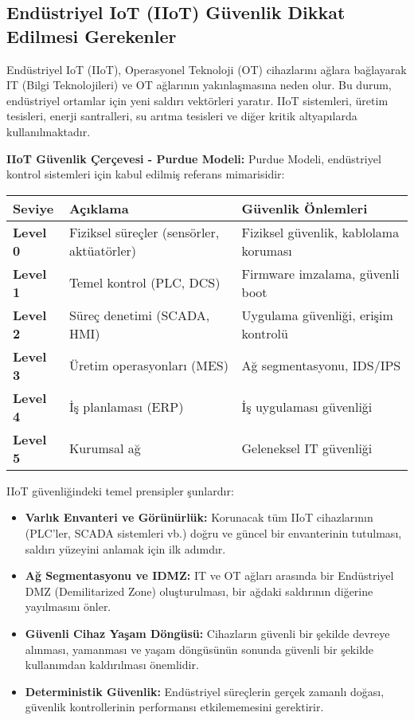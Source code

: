 \subsection{Endüstriyel IoT (IIoT) Güvenlik Dikkat Edilmesi Gerekenler}

Endüstriyel IoT (IIoT), Operasyonel Teknoloji (OT) cihazlarını ağlara bağlayarak IT (Bilgi Teknolojileri) ve OT ağlarının yakınlaşmasına neden olur. Bu durum, endüstriyel ortamlar için yeni saldırı vektörleri yaratır. IIoT sistemleri, üretim tesisleri, enerji santralleri, su arıtma tesisleri ve diğer kritik altyapılarda kullanılmaktadır.

\textbf{IIoT Güvenlik Çerçevesi - Purdue Modeli:}
Purdue Modeli, endüstriyel kontrol sistemleri için kabul edilmiş referans mimarisidir:

\begin{tabular}{|p{4cm}|p{6cm}|p{4cm}|}
\hline
\hline
\textbf{Seviye} & \textbf{Açıklama} & \textbf{Güvenlik Önlemleri} \\
\hline
\hline
\textbf{Level 0} & Fiziksel süreçler (sensörler, aktüatörler) & Fiziksel güvenlik, kablolama koruması \\
\hline
\hline
\textbf{Level 1} & Temel kontrol (PLC, DCS) & Firmware imzalama, güvenli boot \\
\hline
\hline
\textbf{Level 2} & Süreç denetimi (SCADA, HMI) & Uygulama güvenliği, erişim kontrolü \\
\hline
\hline
\textbf{Level 3} & Üretim operasyonları (MES) & Ağ segmentasyonu, IDS/IPS \\
\hline
\hline
\textbf{Level 4} & İş planlaması (ERP) & İş uygulaması güvenliği \\
\hline
\hline
\textbf{Level 5} & Kurumsal ağ & Geleneksel IT güvenliği \\
\hline
\hline
\hline
\end{tabular}

IIoT güvenliğindeki temel prensipler şunlardır:
\begin{itemize}
    \item \textbf{Varlık Envanteri ve Görünürlük:} Korunacak tüm IIoT cihazlarının (PLC'ler, SCADA sistemleri vb.) doğru ve güncel bir envanterinin tutulması, saldırı yüzeyini anlamak için ilk adımdır.
    \item \textbf{Ağ Segmentasyonu ve IDMZ:} IT ve OT ağları arasında bir Endüstriyel DMZ (Demilitarized Zone) oluşturulması, bir ağdaki saldırının diğerine yayılmasını önler.
    \item \textbf{Güvenli Cihaz Yaşam Döngüsü:} Cihazların güvenli bir şekilde devreye alınması, yamanması ve yaşam döngüsünün sonunda güvenli bir şekilde kullanımdan kaldırılması önemlidir.
    \item \textbf{Deterministik Güvenlik:} Endüstriyel süreçlerin gerçek zamanlı doğası, güvenlik kontrollerinin performansı etkilememesini gerektirir.
\end{itemize}

